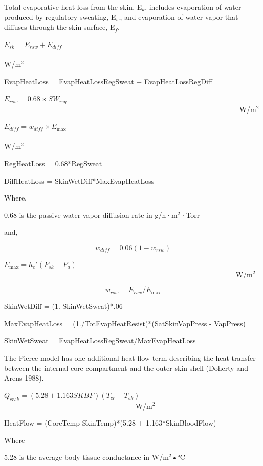 Total evaporative heat loss from the skin, E\(_{k}\), includes evaporation of water produced by regulatory sweating, E\(_{w}\), and evaporation of water vapor that diffuses through the skin surface, E\(_{f}\).

\({E_{sk}} = {E_{rsw}} + {E_{diff}}\) ~~~~~~~~~~~~~~~~~~~~~~~~~~~~~~~~~~~~~~~~~~~~~~~~~~~~~~~~~~~~~~~~~~~~~ W/m\(^{2}\)

EvapHeatLoss = EvapHeatLossRegSweat + EvapHeatLossRegDiff

\({E_{rsw}} = 0.68 \times S{W_{reg}}\) ~~~~~~~~~~~~~~~~~~~~~~~~~~~~~~~~~~~~~~~~~~~~~~~~~~~~~~~~~~~~~~~~~ W/m\(^{2}\)

\({E_{diff}} = {w_{diff}} \times {E_{\max }}\) ~~~~~~~~~~~~~~~~~~~~~~~~~~~~~~~~~~~~~~~~~~~~~~~~~~~~~~~~~~~~~~~~~~~ W/m\(^{2}\)

RegHeatLoss = 0.68*RegSweat

DiffHeatLoss = SkinWetDiff*MaxEvapHeatLoss

Where,

0.68 is the passive water vapor diffusion rate in g/h·m\(^{2}\)·Torr

and,

\begin{equation}
{w_{diff}} = 0.06(1 - {w_{rsw}})
\end{equation}

\({E_{\max }} = {h_e}'({P_{sk}} - {P_a})\) ~~~~~~~~~~~~~~~~~~~~~~~~~~~~~~~~~~~~~~~~~~~~~~~~~~~~~~~~~~~~~~~~ W/m\(^{2}\)

\begin{equation}
{w_{rsw}} = {E_{rsw}}/{E_{\max }}
\end{equation}

SkinWetDiff = (1.-SkinWetSweat)*.06

MaxEvapHeatLoss = (1./TotEvapHeatResist)*(SatSkinVapPress - VapPress)

SkinWetSweat = EvapHeatLossRegSweat/MaxEvapHeatLoss

The Pierce model has one additional heat flow term describing the heat transfer between the internal core compartment and the outer skin shell (Doherty and Arens 1988).

\({Q_{crsk}} = (5.28 + 1.163SKBF)({T_{cr}} - {T_{sk}})\) ~~~~~~~~~~~~~~~~~~~~~~~~~~~~~~~~~~~~ W/m\(^{2}\)

HeatFlow = (CoreTemp-SkinTemp)*(5.28 + 1.163*SkinBloodFlow)

Where

5.28 is the average body tissue conductance in W/m\(^{2}\)•°C


